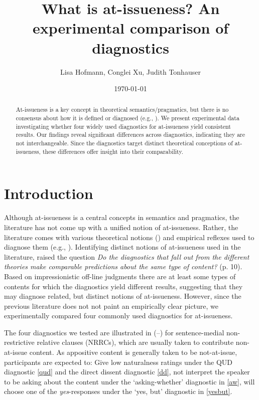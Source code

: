 \documentclass[12pt]{article}
\title{What is at-issueness? An experimental comparison of diagnostics}
\author{\normalsize Lisa Hofmann, Conglei Xu, Judith Tonhauser}
\date{\small\today}
\begin{document}
\maketitle
\begin{abstract}
  At-issueness is a key concept in theoretical semantics/pragmatics, but there is no consensus about how it is defined or diagnosed (e.g., \citealt{tonhauser_diagnosing_2012,tonhauser_how_2018,koev_notions_2018}). We present experimental data investigating whether four widely used diagnostics for at-issueness yield consistent results. Our findings reveal significant differences across diagnostics, indicating they are not interchangeable. Since the diagnostics target distinct theoretical conceptions of at-issueness, these differences offer insight into their comparability.
\end{abstract}
\setcounter{tocdepth}{2}
\tableofcontents
\pagebreak


\section{Introduction}
\label{sec:1_introduction}
  Although at-issueness is a central concepts in semantics and pragmatics, the literature has not come up with a unified notion of at-issueness. Rather, the literature comes with various theoretical notions (\citealt{koev_notions_2018,tonhauser_how_2018}) and empirical reflexes used to diagnose them (e.g., \citealt{tonhauser_diagnosing_2012}). Identifying distinct notions of at-issueness used in the literature, \citealt{koev_notions_2018} raised the question \emph{Do the diagnostics that fall out from the different theories make comparable predictions about the same type of content?} (p. 10). Based on impressionistic off-line judgments there are at least some types of contents for which the diagnostics yield different results, suggesting that they may diagnose related, but distinct notions of at-issueness. However, since the previous literature does not not paint an empirically clear picture, we experimentally compared four commonly used diagnostics for at\hyp issueness.

  The four diagnostics we tested are illustrated in (--) for sentence-medial non-restrictive relative clauses (NRRCs), which are usually taken to contribute non-at-issue content.  As appositive content is generally taken to be not-at-issue, participants are expected to: Give low naturalness ratings under the QUD diagnostic \ref{qud} and the direct dissent diagnostic \ref{dd}, not interpret the speaker to be asking about the content under the `asking-whether' diagnostic in \ref{aw}, will choose one of the %
    \emph{yes}-responses under the `yes, but' diagnostic in \ref{yesbut}.
\end{document}
